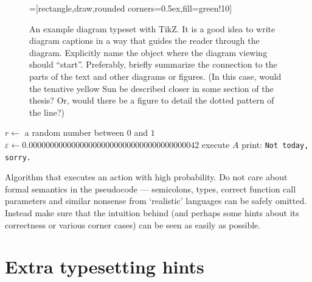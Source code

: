 \begin{figure}
\centering
{}=[rectangle,draw,rounded corners=0.5ex,fill=green!10]
\caption{An example diagram typeset with TikZ. It is a good idea to write diagram captions in a way that guides the reader through the diagram. Explicitly name the object where the diagram viewing should ``start''. Preferably, briefly summarize the connection to the parts of the text and other diagrams or figures. (In this case, would the tenative yellow Sun be described closer in some section of the thesis? Or, would there be a figure to detail the dotted pattern of the line?)}
\label{fig:schema}
\end{figure}

\begin{algorithm}
\begin{algorithmic}
	\State $r \gets$ a random number between $0$ and $1$
	\State $\varepsilon \gets 0.0000000000000000000000000000000000000042$
		\State execute $A$ 
	\Else
		\State print: \texttt{Not today, sorry.}
	\EndIf
\EndFunction
\end{algorithmic}
\caption{Algorithm that executes an action with high probability. Do not care about formal semantics in the pseudocode --- semicolons, types, correct function call parameters and similar nonsense from `realistic' languages can be safely omitted. Instead make sure that the intuition behind (and perhaps some hints about its correctness or various corner cases) can be seen as easily as possible.}
\label{alg:w}
\end{algorithm}

\section{Extra typesetting hints}


